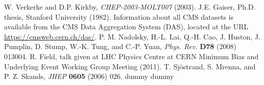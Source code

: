 \documentclass[12pt, letterpaper]{report}
\begin{document}
\begin{thebibliography}{99}
 W. Verkerke and D.P. Kirkby, \textit{CHEP-2003-MOLT007} (2003).
 J.E. Gaiser, Ph.D. thesis, Stanford University (1982).
 Information about all CMS datasets is available from the CMS Data Aggregation System (DAS), located at the URL \url{https://cmsweb.cern.ch/das/}.
 P. M. Nadolsky, H.-L. Lai, Q.-H. Cao, J. Huston, J. Pumplin, D. Stump, W.-K. Tung, and C.-P. Yuan, \textit{Phys. Rev.} \textbf{D78} (2008) 013004.
 R. Field, talk given at LHC Physics Centre at CERN Minimum Bias and Underlying Event Working Group Meeting (2011).
 T. Sj\"ostrand, S. Mrenna, and P. Z. Skands, \textit{JHEP} \textbf{0605} (2006) 026.
 dummy
 dummy
\end{thebibliography}
\end{document}
